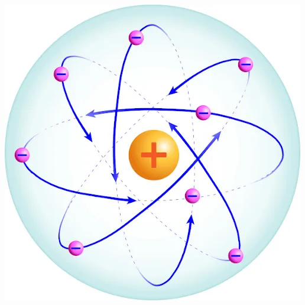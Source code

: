 \documentclass[11pt]{article}
\begin{document}
\begin{exercise}
\begin{choice}
\choice \includegraphics[scale=.2]{Adaptadas/ruther.png}
\end{choice}
\end{exercise}
\end{document}
